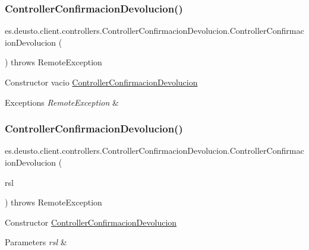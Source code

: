 \subsubsection{\texorpdfstring{ControllerConfirmacionDevolucion()}{ControllerConfirmacionDevolucion()}\hspace{0.1cm}{\footnotesize\ttfamily [1/2]}}
{\footnotesize\ttfamily es.\+deusto.\+client.\+controllers.\+Controller\+Confirmacion\+Devolucion.\+Controller\+Confirmacion\+Devolucion (\begin{DoxyParamCaption}{ }\end{DoxyParamCaption}) throws Remote\+Exception}

Constructor vacio \mbox{\hyperlink{classes_1_1deusto_1_1client_1_1controllers_1_1_controller_confirmacion_devolucion}{Controller\+Confirmacion\+Devolucion}} 
\begin{DoxyExceptions}{Exceptions}
{\em Remote\+Exception} & \\
\hline
\end{DoxyExceptions}
\mbox{\label{classes_1_1deusto_1_1client_1_1controllers_1_1_controller_confirmacion_devolucion_a2d5ebddd9bda62462bfb0cb80846d2a4}} 
\subsubsection{\texorpdfstring{ControllerConfirmacionDevolucion()}{ControllerConfirmacionDevolucion()}\hspace{0.1cm}{\footnotesize\ttfamily [2/2]}}
{\footnotesize\ttfamily es.\+deusto.\+client.\+controllers.\+Controller\+Confirmacion\+Devolucion.\+Controller\+Confirmacion\+Devolucion (\begin{DoxyParamCaption}\item[{\mbox{\hyperlink{classes_1_1deusto_1_1client_1_1remote_1_1_service_locator}{Service\+Locator}}}]{rsl }\end{DoxyParamCaption}) throws Remote\+Exception}

Constructor \mbox{\hyperlink{classes_1_1deusto_1_1client_1_1controllers_1_1_controller_confirmacion_devolucion}{Controller\+Confirmacion\+Devolucion}} 
\begin{DoxyParams}{Parameters}
{\em rsl} & \\
\hline
\end{DoxyParams}

